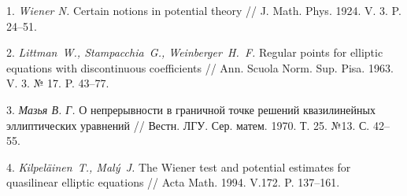 \litlist

1. {\it Wiener N.} Certain notions in potential theory // J. Math. Phys. 1924. V. 3. P. 24--51.

2. {\it Littman~W., Stampacchia~G., Weinberger~H.~F.} Regular points for elliptic equations with discontinuous coefficients // Ann. Scuola Norm. Sup. Pisa. 1963. V. 3. № 17. P. 43--77.


3. {\it Мазья В. Г.} О непрерывности в граничной точке решений квазилинейных эллиптических
уравнений // Вестн. ЛГУ. Сер. матем. 1970. Т. 25. №13. С. 42--55.


4. {\it Kilpel\"ainen~T., Mal\'y~J.} The Wiener test and potential estimates for quasilinear elliptic equations // Acta Math. 1994. V.172. P. 137--161.
